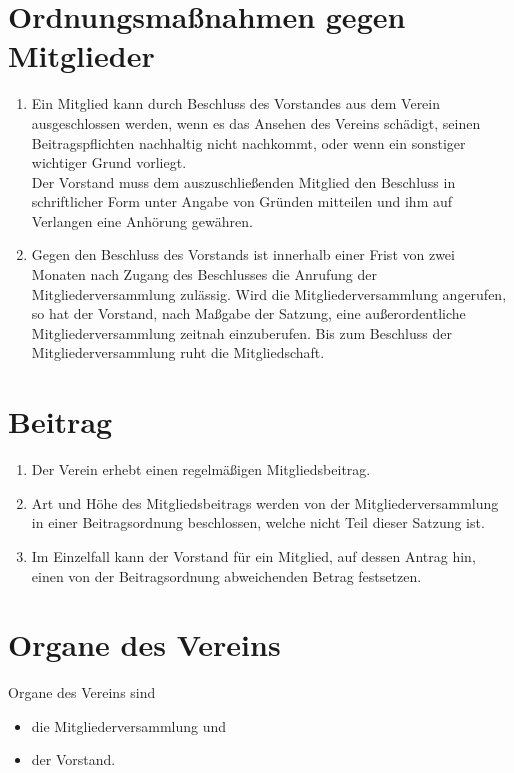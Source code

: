 \documentclass[10pt,a4paper]{scrartcl}
\begin{document}
\section{Ordnungsmaßnahmen gegen Mitglieder}

\begin{enumerate}[label=(\arabic*)]
\item
  Ein Mitglied kann durch Beschluss des Vorstandes aus dem Verein ausgeschlossen
  werden, wenn es das Ansehen des Vereins schädigt, seinen Beitragspflichten
  nachhaltig nicht nachkommt, oder wenn ein sonstiger wichtiger Grund vorliegt.\\
  Der Vorstand muss dem auszuschließenden Mitglied den Beschluss in schriftlicher
  Form unter Angabe von Gründen mitteilen und ihm auf Verlangen eine Anhörung
  gewähren.
\item
  Gegen den Beschluss des Vorstands ist innerhalb einer Frist von zwei Monaten nach
  Zugang des Beschlusses die Anrufung der Mitgliederversammlung zulässig. Wird die
  Mitgliederversammlung angerufen, so hat der Vorstand, nach Maßgabe der Satzung,
  eine außerordentliche Mitgliederversammlung zeitnah einzuberufen. Bis zum
  Beschluss der Mitgliederversammlung ruht die Mitgliedschaft.
\end{enumerate}


\section{Beitrag}

\begin{enumerate}[label=(\arabic*)]
\item
  Der Verein erhebt einen regelmäßigen Mitgliedsbeitrag.
\item
  Art und Höhe des Mitgliedsbeitrags werden von der Mitgliederversammlung in einer
  Beitragsordnung beschlossen, welche nicht Teil dieser Satzung ist.
\item
  Im Einzelfall kann der Vorstand für ein Mitglied, auf dessen Antrag hin, einen von der
  Beitragsordnung abweichenden Betrag festsetzen.
\end{enumerate}


\section{Organe des Vereins}

Organe des Vereins sind
\begin{itemize}
\item
  die Mitgliederversammlung und
\item
  der Vorstand.
\end{itemize}
\end{document}
